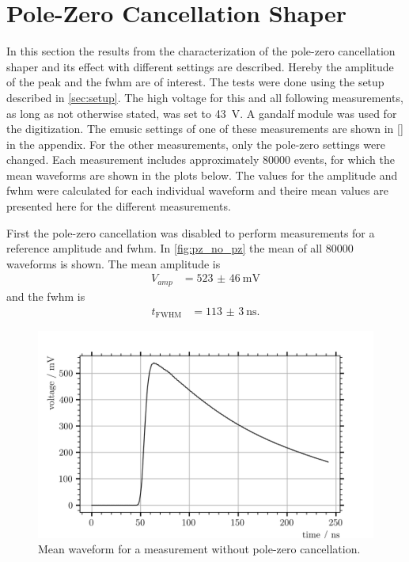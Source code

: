 \section{Pole-Zero Cancellation Shaper}

In this section the results from the characterization of the pole-zero cancellation shaper and its effect with different settings are described.
Hereby the amplitude of the peak and the \ac{fwhm} are of interest.
The tests were done using the setup described in \autoref{sec:setup}.
The high voltage for this and all following measurements, as long as not otherwise stated, was set to \SI{43}{\volt}. 
A \ac{gandalf} module was used for the digitization.
The \ac{emusic} settings of one of these measurements are shown in \autoref{} in the appendix.
For the other measurements, only the pole-zero settings were changed.
Each measurement includes approximately \num{80000} events, for which the mean waveforms are shown in the plots below.
The values for the amplitude and \ac{fwhm} were calculated for each individual waveform and theire mean values are presented here for the different measurements.

First the pole-zero cancellation was disabled to perform measurements for a reference amplitude and \ac{fwhm}.
In \autoref{fig:pz_no_pz} the mean of all \num{80000} waveforms is shown.
The mean amplitude is 
\begin{align}
    V_{amp} &= \SI{523(46)}{\milli\volt}
\end{align}
and the \ac{fwhm} is
\begin{align}
    t_\text{FWHM} &= \SI{113(3)}{\nano\second}.
\end{align}
\begin{figure}
	\centering
	\includegraphics[width=1.\textwidth]{pictures/pz_no_pz}
	\caption[Mean waveform for a measurement without pole-zero cancellation.]{Mean waveform for a measurement without pole-zero cancellation.}
	\label{fig:pz_no_pz}
\end{figure}

